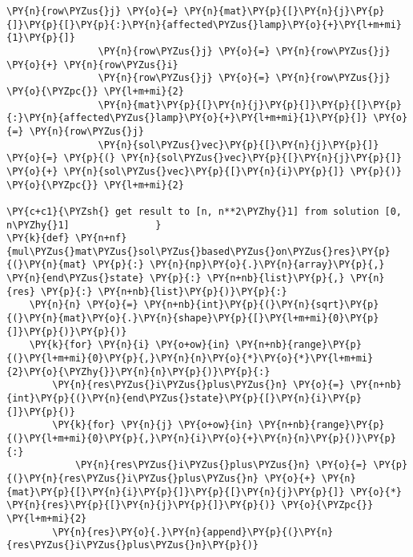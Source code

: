 \begin{english}
\begin{tcolorbox}[breakable, size=fbox, boxrule=1pt, pad at break*=1mm,colback=cellbackground, colframe=cellborder]
\begin{Verbatim}[commandchars=\\\{\}]
                \PY{n}{row\PYZus{}j} \PY{o}{=} \PY{n}{mat}\PY{p}{[}\PY{n}{j}\PY{p}{]}\PY{p}{[}\PY{p}{:}\PY{n}{affected\PYZus{}lamp}\PY{o}{+}\PY{l+m+mi}{1}\PY{p}{]}
                \PY{n}{row\PYZus{}j} \PY{o}{=} \PY{n}{row\PYZus{}j} \PY{o}{+} \PY{n}{row\PYZus{}i}
                \PY{n}{row\PYZus{}j} \PY{o}{=} \PY{n}{row\PYZus{}j} \PY{o}{\PYZpc{}} \PY{l+m+mi}{2}
                \PY{n}{mat}\PY{p}{[}\PY{n}{j}\PY{p}{]}\PY{p}{[}\PY{p}{:}\PY{n}{affected\PYZus{}lamp}\PY{o}{+}\PY{l+m+mi}{1}\PY{p}{]} \PY{o}{=} \PY{n}{row\PYZus{}j}
                \PY{n}{sol\PYZus{}vec}\PY{p}{[}\PY{n}{j}\PY{p}{]} \PY{o}{=} \PY{p}{(} \PY{n}{sol\PYZus{}vec}\PY{p}{[}\PY{n}{j}\PY{p}{]} \PY{o}{+} \PY{n}{sol\PYZus{}vec}\PY{p}{[}\PY{n}{i}\PY{p}{]} \PY{p}{)} \PY{o}{\PYZpc{}} \PY{l+m+mi}{2}

\PY{c+c1}{\PYZsh{} get result to [n, n**2\PYZhy{}1] from solution [0, n\PYZhy{}1]               }
\PY{k}{def} \PY{n+nf}{mul\PYZus{}mat\PYZus{}sol\PYZus{}based\PYZus{}on\PYZus{}res}\PY{p}{(}\PY{n}{mat} \PY{p}{:} \PY{n}{np}\PY{o}{.}\PY{n}{array}\PY{p}{,} \PY{n}{end\PYZus{}state} \PY{p}{:} \PY{n+nb}{list}\PY{p}{,} \PY{n}{res} \PY{p}{:} \PY{n+nb}{list}\PY{p}{)}\PY{p}{:}
    \PY{n}{n} \PY{o}{=} \PY{n+nb}{int}\PY{p}{(}\PY{n}{sqrt}\PY{p}{(}\PY{n}{mat}\PY{o}{.}\PY{n}{shape}\PY{p}{[}\PY{l+m+mi}{0}\PY{p}{]}\PY{p}{)}\PY{p}{)}
    \PY{k}{for} \PY{n}{i} \PY{o+ow}{in} \PY{n+nb}{range}\PY{p}{(}\PY{l+m+mi}{0}\PY{p}{,}\PY{n}{n}\PY{o}{*}\PY{o}{*}\PY{l+m+mi}{2}\PY{o}{\PYZhy{}}\PY{n}{n}\PY{p}{)}\PY{p}{:}
        \PY{n}{res\PYZus{}i\PYZus{}plus\PYZus{}n} \PY{o}{=} \PY{n+nb}{int}\PY{p}{(}\PY{n}{end\PYZus{}state}\PY{p}{[}\PY{n}{i}\PY{p}{]}\PY{p}{)}
        \PY{k}{for} \PY{n}{j} \PY{o+ow}{in} \PY{n+nb}{range}\PY{p}{(}\PY{l+m+mi}{0}\PY{p}{,}\PY{n}{i}\PY{o}{+}\PY{n}{n}\PY{p}{)}\PY{p}{:}
            \PY{n}{res\PYZus{}i\PYZus{}plus\PYZus{}n} \PY{o}{=} \PY{p}{(}\PY{n}{res\PYZus{}i\PYZus{}plus\PYZus{}n} \PY{o}{+} \PY{n}{mat}\PY{p}{[}\PY{n}{i}\PY{p}{]}\PY{p}{[}\PY{n}{j}\PY{p}{]} \PY{o}{*} \PY{n}{res}\PY{p}{[}\PY{n}{j}\PY{p}{]}\PY{p}{)} \PY{o}{\PYZpc{}} \PY{l+m+mi}{2}
        \PY{n}{res}\PY{o}{.}\PY{n}{append}\PY{p}{(}\PY{n}{res\PYZus{}i\PYZus{}plus\PYZus{}n}\PY{p}{)}


\end{Verbatim}
\end{tcolorbox}
\end{english}
